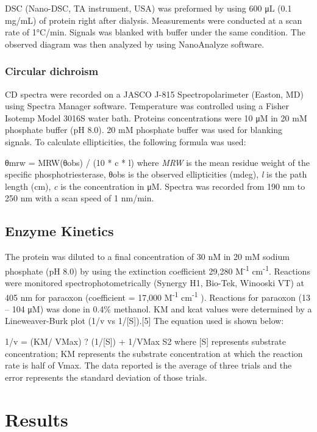 \begin{refsection}
DSC (Nano-DSC, TA instrument, USA) was preformed by using 600 μL (0.1 mg/mL) of
protein right after dialysis. Measurements were conducted at a scan rate of
1°C/min. Signals was blanked with buffer under the same condition. The observed
diagram was then analyzed by using NanoAnalyze software.

\subsubsection{Circular dichroism}

CD spectra were recorded on a JASCO J-815 Spectropolarimeter (Easton, MD) using
Spectra Manager software. Temperature was controlled using a Fisher Isotemp
Model 3016S water bath. Proteins concentrations were 10 μM in 20 mM phosphate
buffer (pH 8.0). 20 mM phosphate buffer was used for blanking signals. To
calculate ellipticities, the following formula was used:

θmrw = MRW(θobs) / (10 * c * l)
where \emph{MRW} is the mean residue weight of the specific phosphotriesterase, θobs
is the observed ellipticities (mdeg), \emph{l} is the path length (cm), \emph{c} is the
concentration in μM. Spectra was recorded from 190 nm to 250 nm with a scan
speed of 1 nm/min.

\subsection{Enzyme Kinetics}

The protein was diluted to a final concentration of 30 nM in 20 mM sodium
phosphate (pH 8.0) by using the extinction coefficient 29,280
M\textsuperscript{-1} cm\textsuperscript{-1}. Reactions were monitored
spectrophotometrically (Synergy H1, Bio-Tek, Winooski VT) at 405 nm for
paraoxon (coefficient = 17,000 M\textsuperscript{-1}  cm\textsuperscript{-1} ).
Reactions for paraoxon (13 – 104 μM) was done in 0.4\% methanol. KM and kcat
values were determined by a Lineweaver-Burk plot (1/v vs 1/[S]).[5] The
equation used is shown below: 

1/v = (KM/ VMax) ? (1/[S]) + 1/VMax S2
where [S] represents substrate concentration; KM represents the substrate
concentration at which the reaction rate is half of Vmax. The data reported is
the average of three trials and the error represents the standard deviation of
those trials.

\section{Results}


\end{refsection}
